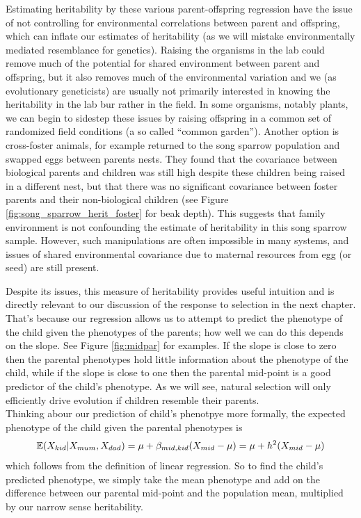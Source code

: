 Estimating heritability by these various parent-offspring regression have the issue of not controlling for
environmental correlations between parent and offspring, which can
inflate our estimates of heritability (as we will mistake
environmentally mediated resemblance for genetics). Raising the
organisms in the lab could remove much of the potential for shared
environment between parent and offspring, but it also removes much of the
environmental variation and we (as evolutionary geneticists) are usually not primarily interested in knowing
the heritability in the lab bur rather in the field. In some organisms,
notably plants, we can begin to sidestep these issues by raising offspring
in a common set of randomized field conditions (a so called ``common
garden''). Another option is cross-foster animals, for example
\citet{smith1980experimental} returned to the song sparrow population
and swapped eggs between parents nests. They found that the covariance
between biological parents and children was still high despite these
children being raised in a different nest, but that there was no significant
covariance between foster parents and their non-biological children
(see Figure \ref{fig:song_sparrow_herit_foster} for beak depth). This suggests that
family environment is not confounding the estimate of heritability in
this song sparrow sample. However, such manipulations are often
impossible in many systems, and issues of shared environmental
covariance due to maternal resources from egg (or seed) are still present. 

Despite its issues, this measure of heritability provides useful
intuition and is directly relevant to our discussion of the response to selection in
the next chapter. That's because our regression allows us to attempt to predict the phenotype of the
child given the phenotypes of the parents; how well we can do this depends on the
slope. See Figure \ref{fig:midpar} for examples. If the slope is close
to zero then the parental phenotypes hold little
information about the phenotype of the child, while if the slope is
close to one then the parental mid-point is a good predictor of the child's
phenotype. As we will see, natural selection will only efficiently
drive evolution if children resemble their parents.\\

Thinking abour our prediction of child's phenotpye more formally, the expected phenotype of the child given the parental
phenotypes is
\begin{equation}
\mathbb{E}(X_{kid} | X_{mum},X_{dad}) = \mu +
\beta_{mid,kid}(X_{mid} - \mu) =\mu + h^2(X_{mid} - \mu)  \label{predict_kid}
\end{equation}
which follows from the definition of linear regression. So to find the
child's predicted phenotype, we simply take the mean phenotype and add on the difference between our parental mid-point and the population mean, multiplied by our
narrow sense heritability. \\


